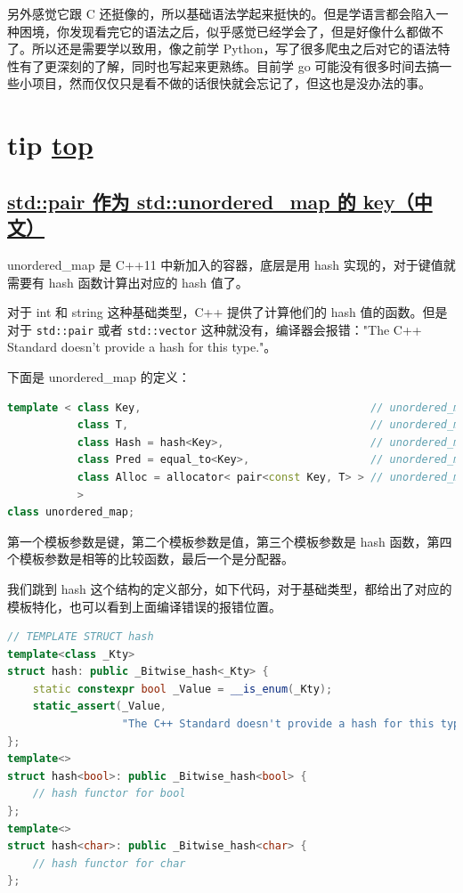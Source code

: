 另外感觉它跟 C 还挺像的，所以基础语法学起来挺快的。但是学语言都会陷入一种困境，你发现看完它的语法之后，似乎感觉已经学会了，但是好像什么都做不了。所以还是需要学以致用，像之前学 Python，写了很多爬虫之后对它的语法特性有了更深刻的了解，同时也写起来更熟练。目前学 go 可能没有很多时间去搞一些小项目，然而仅仅只是看不做的话很快就会忘记了，但这也是没办法的事。

\section{tip \hyperref[chap:w2]{top}}\label{w2:tip}

\subsection{\href{https://blog.csdn.net/Bob__yuan/article/details/96737222}{std::pair 作为 std::unordered\_map 的 key（中文）}}

unordered\_map 是 C++11 中新加入的容器，底层是用 hash 实现的，对于键值就需要有 hash 函数计算出对应的 hash 值了。

对于 int 和 string 这种基础类型，C++ 提供了计算他们的 hash 值的函数。但是对于 \lstinline{std::pair} 或者 \lstinline{std::vector} 这种就没有，编译器会报错："The C++ Standard doesn't provide a hash for this type."。

下面是 unordered\_map 的定义：

\begin{lstlisting}[language=C++]
template < class Key,                                    // unordered_map::key_type
           class T,                                      // unordered_map::mapped_type
           class Hash = hash<Key>,                       // unordered_map::hasher
           class Pred = equal_to<Key>,                   // unordered_map::key_equal
           class Alloc = allocator< pair<const Key, T> > // unordered_map::allocator_type
           >
class unordered_map;
\end{lstlisting}

第一个模板参数是键，第二个模板参数是值，第三个模板参数是 hash 函数，第四个模板参数是相等的比较函数，最后一个是分配器。

我们跳到 hash 这个结构的定义部分，如下代码，对于基础类型，都给出了对应的模板特化，也可以看到上面编译错误的报错位置。

\begin{lstlisting}[language=C++]
// TEMPLATE STRUCT hash
template<class _Kty>
struct hash: public _Bitwise_hash<_Kty> {
	static constexpr bool _Value = __is_enum(_Kty);
	static_assert(_Value,
	              "The C++ Standard doesn't provide a hash for this type.");
};
template<>
struct hash<bool>: public _Bitwise_hash<bool> {
	// hash functor for bool
};
template<>
struct hash<char>: public _Bitwise_hash<char> {
	// hash functor for char
};
\end{lstlisting}

